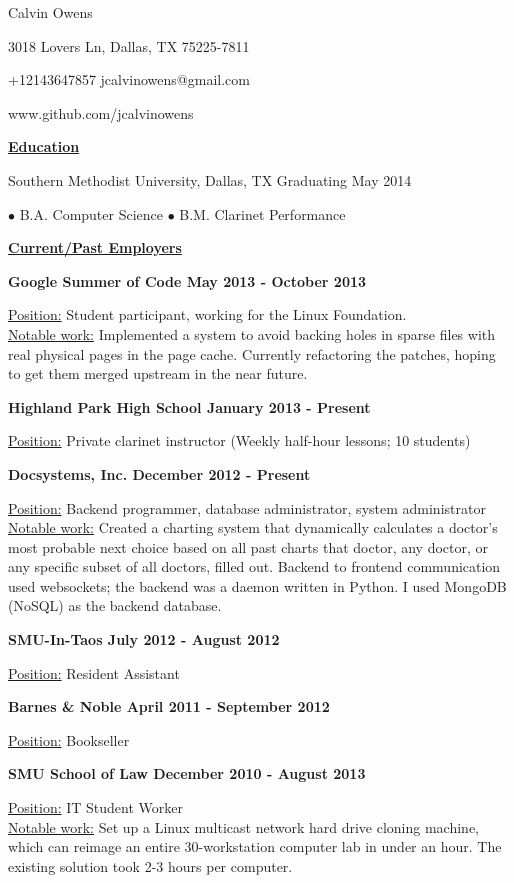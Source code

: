 \documentclass[11pt]{article}
\begin{document}
\centerline{{\Huge \sc Calvin Owens}}
\centerline{3018 Lovers Ln, Dallas, TX 75225-7811}
\centerline{+12143647857 \textbullet \hspace{1pt} jcalvinowens@gmail.com}
\centerline{www.github.com/jcalvinowens}

\noindent
\hrulefill

\centerline{\underline{\bf Education}}
\bigskip
\centerline{Southern Methodist University, Dallas, TX \hfill Graduating May 2014}
\centerline{\hfill $\bullet$ B.A. Computer Science \hfill $\bullet$ B.M. Clarinet Performance \hfill}

\noindent
\hrulefill

\centerline{\underline{\bf Current/Past Employers}}
\bigskip
\noindent\centerline{\bf Google Summer of Code \hfill May 2013 - October 2013}
\underline{Position:} Student participant, working for the Linux Foundation. \\
\underline{Notable work:} Implemented a system to avoid backing holes in sparse
files with real physical pages in the page cache. Currently refactoring the
patches, hoping to get them merged upstream in the near future.
\vspace*{6pt}\\
\noindent\centerline{\bf Highland Park High School \hfill January 2013 - Present}
\underline{Position:} Private clarinet instructor (Weekly half-hour lessons; 10 students)
\vspace*{6pt}\\
\noindent\centerline{\bf Docsystems, Inc. \hfill December 2012 - Present}
\underline{Position:} Backend programmer, database administrator, system administrator \\
\underline{Notable work:} Created a charting system that dynamically calculates
a doctor's most probable next choice based on all past charts that doctor, any
doctor, or any specific subset of all doctors, filled out. Backend to frontend
communication used websockets; the backend was a daemon written in Python. I
used MongoDB (NoSQL) as the backend database.
\vspace*{6pt}\\
\noindent\centerline{\bf SMU-In-Taos \hfill July 2012 - August 2012}
\underline{Position:} Resident Assistant
\vspace*{6pt}\\
\noindent\centerline{\bf Barnes \& Noble \hfill April 2011 - September 2012}
\underline{Position:} Bookseller
\vspace*{6pt}\\
\noindent\centerline{\bf SMU School of Law \hfill December 2010 - August 2013}
\underline{Position:} IT Student Worker\\
\underline{Notable work:} Set up a Linux multicast network hard drive cloning
machine, which can reimage an entire 30-workstation computer lab in under an
hour. The existing solution took 2-3 hours per computer.
\end{document}

